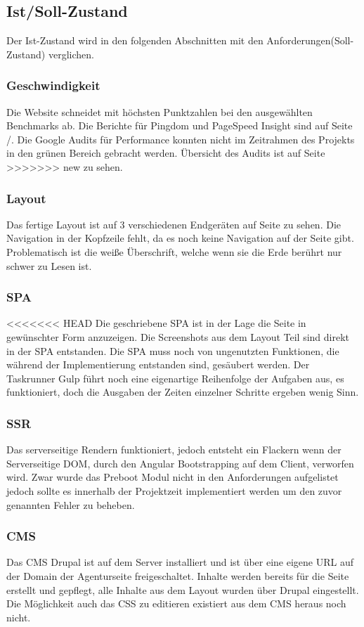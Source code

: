 \documentclass[11pt,a4paper]{article}
\begin{document}
\subsection{Ist/Soll-Zustand}
Der Ist-Zustand wird in den folgenden Abschnitten mit den Anforderungen(Soll-Zustand) verglichen.
\subsubsection{Geschwindigkeit}
Die Website schneidet mit höchsten Punktzahlen bei den ausgewählten Benchmarks ab.
Die Berichte für Pingdom und PageSpeed Insight sind auf Seite  \pageref{sec:google}/\pageref{sec:pingdom}. Die Google Audits für Performance konnten nicht im Zeitrahmen des Projekts in den grünen Bereich gebracht werden. Übersicht des Audits ist auf Seite \pageref{sec:audit}
>>>>>>> new
zu sehen.
\subsubsection{Layout}
Das fertige Layout ist auf 3 verschiedenen Endgeräten auf Seite \pageref{sec:responsive}
zu sehen. Die Navigation in der Kopfzeile fehlt, da es noch keine Navigation auf der Seite gibt.
Problematisch ist die weiße Überschrift, welche wenn sie die Erde berührt nur schwer zu Lesen ist.
\subsubsection{SPA}
<<<<<<< HEAD
Die geschriebene SPA ist in der Lage die Seite in gewünschter Form anzuzeigen. Die Screenshots aus dem Layout Teil sind direkt in der SPA entstanden. Die SPA muss noch von ungenutzten Funktionen, die während der Implementierung entstanden sind, gesäubert werden. Der Taskrunner Gulp führt noch eine eigenartige Reihenfolge der Aufgaben aus,  es funktioniert, doch die Ausgaben der Zeiten einzelner Schritte ergeben wenig Sinn.
\subsubsection{SSR}
Das serverseitige Rendern funktioniert, jedoch entsteht ein Flackern wenn der Serverseitige DOM, durch den Angular Bootstrapping auf dem Client, verworfen wird. Zwar wurde das Preboot Modul nicht in den Anforderungen aufgelistet jedoch sollte es innerhalb der Projektzeit implementiert werden um den zuvor genannten Fehler zu beheben.
\subsubsection{CMS}
Das \acs{CMS} Drupal ist auf dem Server installiert und ist über eine eigene URL auf der Domain der Agenturseite freigeschaltet. Inhalte werden bereits für die Seite erstellt und gepflegt, alle Inhalte aus dem Layout wurden über Drupal eingestellt. Die Möglichkeit auch das CSS zu editieren existiert aus dem CMS heraus noch nicht.
\end{document}
